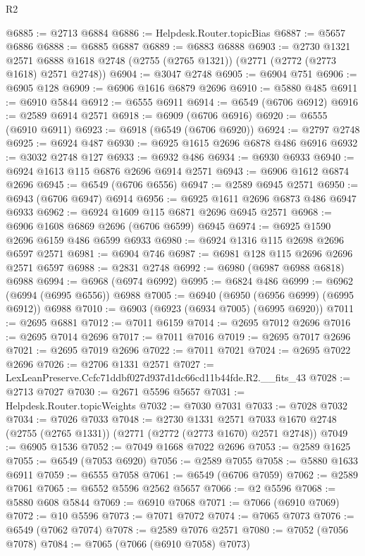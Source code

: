 \begin{lexlean}{R2}
\begin{coremodule}
@6885 := @2713 @6884
@6886 := Helpdesk.Router.topicBias
@6887 := @5657 @6886
@6888 := @6885 @6887
@6889 := @6883 @6888
@6903 := @2730
    @1321
    @2571
    @6888
    @1618
    @2748
    (@2755 (@2765 @1321))
    (@2771 (@2772 (@2773 @1618) @2571 @2748))
@6904 := @3047 @2748
@6905 := @6904 @751
@6906 := @6905 @128
@6909 := @6906 @1616 @6879 @2696
@6910 := @5880 @485
@6911 := @6910 @5844
@6912 := @6555 @6911
@6914 := @6549 (@6706 @6912)
@6916 := @2589 @6914 @2571
@6918 := @6909 (@6706 @6916)
@6920 := @6555 (@6910 @6911)
@6923 := @6918 (@6549 (@6706 @6920))
@6924 := @2797 @2748
@6925 := @6924 @487
@6930 := @6925 @1615 @2696 @6878 @486 @6916
@6932 := @3032 @2748 @127
@6933 := @6932 @486
@6934 := @6930 @6933
@6940 := @6924 @1613 @115 @6876 @2696 @6914 @2571
@6943 := @6906 @1612 @6874 @2696
@6945 := @6549 (@6706 @6556)
@6947 := @2589 @6945 @2571
@6950 := @6943 (@6706 @6947) @6914
@6956 := @6925 @1611 @2696 @6873 @486 @6947 @6933
@6962 := @6924 @1609 @115 @6871 @2696 @6945 @2571
@6968 := @6906 @1608 @6869 @2696 (@6706 @6599) @6945
@6974 := @6925 @1590 @2696 @6159 @486 @6599 @6933
@6980 := @6924 @1316 @115 @2698 @2696 @6597 @2571
@6981 := @6904 @746
@6987 := @6981 @128 @115 @2696 @2696 @2571 @6597
@6988 := @2831 @2748
@6992 := @6980 (@6987 @6988 @6818) @6988
@6994 := @6968 (@6974 @6992)
@6995 := @6824 @486
@6999 := @6962 (@6994 (@6995 @6556)) @6988
@7005 := @6940 (@6950 (@6956 @6999) (@6995 @6912)) @6988
@7010 := @6903 (@6923 (@6934 @7005) (@6995 @6920))
@7011 := @2695 @6881
@7012 := @7011 @6159
@7014 := @2695 @7012 @2696
@7016 := @2695 @7014 @2696
@7017 := @7011 @7016
@7019 := @2695 @7017 @2696
@7021 := @2695 @7019 @2696
@7022 := @7011 @7021
@7024 := @2695 @7022 @2696
@7026 := @2706 @1331 @2571
@7027 := LexLeanPreserve.Ccfc71ddbf027d937d1dc66cd11b44fde.R2.__fits_43
@7028 := @2713 @7027
@7030 := @2671 @5596 @5657
@7031 := Helpdesk.Router.topicWeights
@7032 := @7030 @7031
@7033 := @7028 @7032
@7034 := @7026 @7033
@7048 := @2730
    @1331
    @2571
    @7033
    @1670
    @2748
    (@2755 (@2765 @1331))
    (@2771 (@2772 (@2773 @1670) @2571 @2748))
@7049 := @6905 @1536
@7052 := @7049 @1668 @7022 @2696
@7053 := @2589 @1625
@7055 := @6549 (@7053 @6920)
@7056 := @2589 @7055
@7058 := @5880 @1633 @6911
@7059 := @6555 @7058
@7061 := @6549 (@6706 @7059)
@7062 := @2589 @7061
@7065 := @6552 @5596 @2562 @5657
@7066 := @2 @5596
@7068 := @5880 @608 @5844
@7069 := @6910 @7068
@7071 := @7066 (@6910 @7069)
@7072 := @10 @5596
@7073 := @7071 @7072
@7074 := @7065 @7073
@7076 := @6549 (@7062 @7074)
@7078 := @2589 @7076 @2571
@7080 := @7052 (@7056 @7078)
@7084 := @7065 (@7066 (@6910 @7058) @7073)

\end{coremodule}
\end{lexlean}
